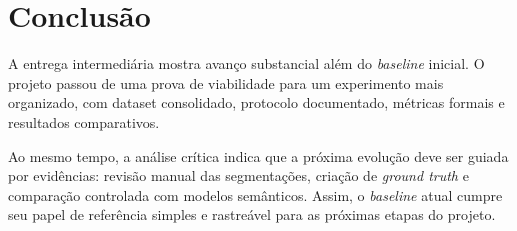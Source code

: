 \documentclass[12pt]{article}
\begin{document}
\section{Conclusão}

A entrega intermediária mostra avanço substancial além do \textit{baseline} inicial. O projeto passou de uma prova de viabilidade para um experimento mais organizado, com dataset consolidado, protocolo documentado, métricas formais e resultados comparativos.

Ao mesmo tempo, a análise crítica indica que a próxima evolução deve ser guiada por evidências: revisão manual das segmentações, criação de \textit{ground truth} e comparação controlada com modelos semânticos. Assim, o \textit{baseline} atual cumpre seu papel de referência simples e rastreável para as próximas etapas do projeto.
\end{document}
